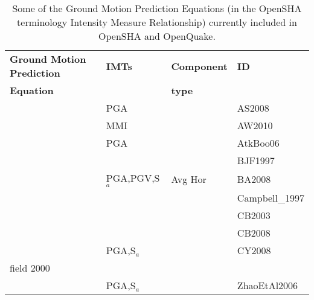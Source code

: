 \begin{table}[!t]
\centering
\begin{tabular}{llll} \hline
\textbf{Ground Motion Prediction} & \textbf{IMTs} & \textbf{Component } & \textbf{ID} \\
\textbf{Equation}& & \textbf{type} & \\ 
\hline
\cite{abrahamson2008} & PGA & & AS2008 \\
\cite{allen2010} & MMI & & AW2010 \\
\cite{atkinson2006} & PGA & & AtkBoo06 \\
\cite{boore1997} &  &  & BJF1997 \\
\cite{boore2008} & PGA,PGV,S$_{a}$ & Avg Hor & BA2008 \\
\cite{campbell1997} &  &  & Campbell\_1997 \\
\cite{campbell2003} &  &  & CB2003 \\
\cite{campbell2008} &  &  & CB2008 \\
\cite{chiou2008} & PGA,S$_{a}$ &  & CY2008 \\
field 2000 &  &  &  \\
\cite{zhao2006} & PGA,S$_{a}$ &  & ZhaoEtAl2006 \\
\hline
\end{tabular}
\caption{Some of the Ground Motion Prediction Equations (in the OpenSHA 
terminology Intensity Measure Relationship) currently included in OpenSHA 
and OpenQuake.}
\label{tab:OQ_GMPEs}
\end{table}